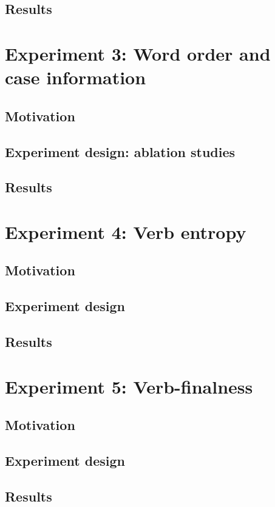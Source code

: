 \subsection{Results}

\section{Experiment 3: Word order and case information}
\subsection{Motivation}
\subsection{Experiment design: ablation studies}
\subsection{Results}

\section{Experiment 4: Verb entropy}
\subsection{Motivation}
\subsection{Experiment design}
\subsection{Results}

\section{Experiment 5: Verb-finalness}
\subsection{Motivation}
\subsection{Experiment design}
\subsection{Results}